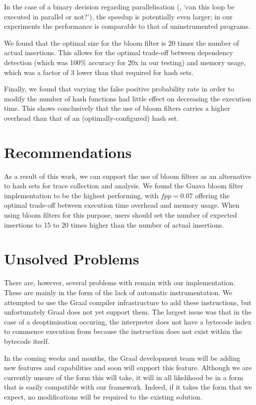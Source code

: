 In the case of a binary decision regarding parallelisation (\ie, `can this loop be executed in parallel or not?'), the speedup is potentially even larger; in our experiments the performance is comparable to that of uninstrumented programs.

We found that the optimal size for the bloom filter is 20 times the number of actual insertions. This allows for the optimal trade-off between dependency detection (which was 100\% accuracy for 20x in our testing) and memory usage, which was a factor of 3 lower than that required for hash sets.

Finally, we found that varying the false positive probability rate in order to modify the number of hash functions had little effect on decreasing the execution time. This shows conclusively that the use of bloom filters carries a higher overhead than that of an (optimally-configured) hash set.

\section{Recommendations} \label{sec:conclusion/recommend}
As a result of this work, we can support the use of bloom filters as an alternative to hash sets for trace collection and analysis. We found the Guava bloom filter implementation to be the highest performing, with $fpp=0.07$ offering the optimal trade-off between execution time overhead and memory usage. When using bloom filters for this purpose, users should set the number of expected insertions to 15 to 20 times higher than the number of actual insertions.

\section{Unsolved Problems} \label{sec:conclusion/unsolved}
There are, however, several problems with remain with our implementation. These are mainly in the form of the lack of automatic instrumentation. We attempted to use the Graal compiler infrastructure to add these instructions, but unfortunately Graal does not yet support them. The largest issue was that in the case of a deoptimisation occuring, the interpreter does not have a bytecode index to commence execution from because the instruction does not exist within the bytecode itself.

In the coming weeks and months, the Graal development team will be adding new features and capabilities and soon will support this feature. Although we are currently unsure of the form this will take, it will in all likelihood be in a form that is easily compatible with our framework. Indeed, if it takes the form that we expect, no modifications will be required to the existing solution.

